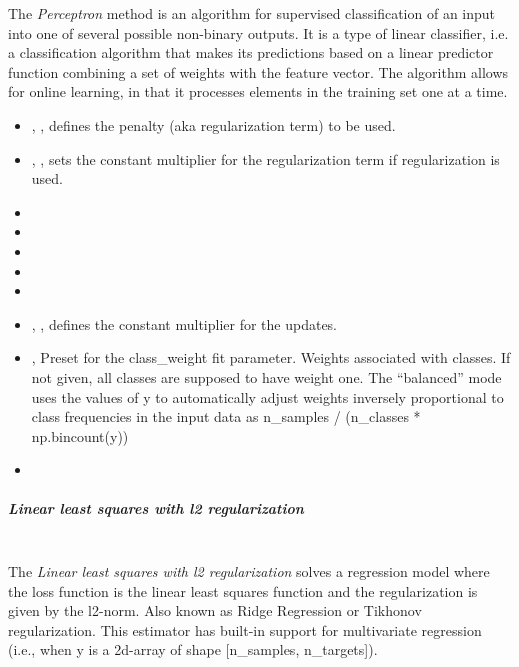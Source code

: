 The \textit{Perceptron} method is an algorithm for supervised classification of
an input into one of several possible non-binary outputs.
%
It is a type of linear classifier, i.e. a classification algorithm that makes
its predictions based on a linear predictor function combining a set of weights
with the feature vector.
%
The algorithm allows for online learning, in that it processes elements in the
training set one at a time.
%
\begin{itemize}
  \item {}, , defines
  the penalty (aka regularization term) to be used.
  \item {}, , sets the constant multiplier for the
  regularization term if regularization is used.
  \item {}
  \item {}
  \item {}
  \item {}
  \item {}
  \item {}, , defines the constant
  multiplier for the updates.
  \item {}, 
  Preset for the class\_weight fit parameter.
  Weights associated with classes. If not given, all classes are supposed to have weight one.
  The “balanced” mode uses the values of y to automatically adjust weights inversely proportional to class
  frequencies in the input data as n\_samples / (n\_classes * np.bincount(y))
  \item {}
\end{itemize}
\subparagraph{Linear least squares with l2 regularization}
\mbox{}
\\The \textit{Linear least squares with l2 regularization} solves a regression
model where the loss function is the linear least squares function and the
regularization is given by the l2-norm.
%
Also known as Ridge Regression or Tikhonov regularization.
%
This estimator has built-in support for multivariate regression (i.e., when y
is a 2d-array of shape [n\_samples, n\_targets]).
